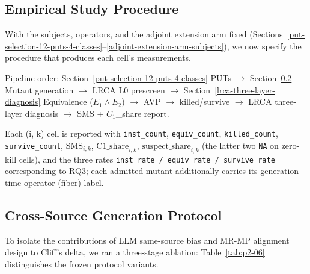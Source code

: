 \documentclass[review,12pt,authoryear]{elsarticle}
\begin{document}
\subsection{Empirical Study Procedure}\label{procedure-overview}

With the subjects, operators, and the adjoint extension arm fixed
(Sections~\ref{put-selection-12-puts-4-classes}--\ref{adjoint-extension-arm-subjects}), we now specify the procedure that produces each cell's
measurements.

\noindent\textsf{\small Pipeline order: Section~\ref{put-selection-12-puts-4-classes} PUTs $\to$ Section~\ref{cross-source-v4-protocol-summary} Mutant generation $\to$ LRCA L0 prescreen $\to$ Section~\ref{lrca-three-layer-diagnosis} Equivalence ($E_1 \wedge E_2$) $\to$ AVP $\to$ killed/survive $\to$ LRCA three-layer diagnosis $\to$ SMS + $C_1$\_share report.}

Each (i, k) cell is reported with \texttt{inst\_count},
\texttt{equiv\_count}, \texttt{killed\_count}, \texttt{survive\_count},
$\mathrm{SMS}_{i,k}$, $\mathrm{C1\_share}_{i,k}$,
$\mathrm{suspect\_share}_{i,k}$ (the latter two \texttt{NA} on
zero-kill cells), and the
three rates \texttt{inst\_rate\ /\ equiv\_rate\ /\ survive\_rate}
corresponding to RQ3; each admitted mutant additionally carries its
generation-time operator (fiber) label.

\subsection{Cross-Source Generation Protocol}\label{cross-source-v4-protocol-summary}

To isolate the contributions of LLM same-source bias and MR-MP alignment
design to Cliff's delta, we ran a three-stage ablation:
Table~\ref{tab:p2-06} distinguishes the frozen protocol variants.
\end{document}
